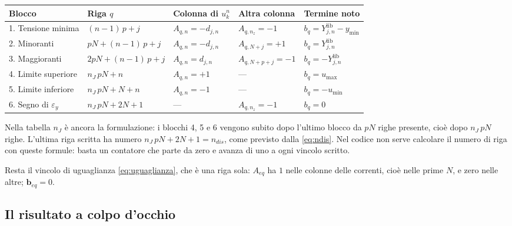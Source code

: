 \documentclass[11pt,a4paper]{article}
\newcommand{\vett}[1]{\boldsymbol{#1}}      %
\newcommand{\lib}{\mathrm{lib}}             %
\begin{document}
\begin{center}
\setlength{\tabcolsep}{4pt}
\begin{tabular}{lllll}
\toprule
Blocco & Riga $q$ & Colonna di $u^n_k$ & Altra colonna & Termine noto \\
\midrule
1. Tensione minima & $(n-1)\,p + j$ & $A_{q,n} = -d_{j,n}$ & $A_{q,n_z} = -1$ & $b_q = Y^\lib_{j,n} - y_{\min}$ \\
2. Minoranti & $pN + (n-1)\,p + j$ & $A_{q,n} = -d_{j,n}$ & $A_{q,N+j} = +1$ & $b_q = Y^\lib_{j,n}$ \\
3. Maggioranti & $2pN + (n-1)\,p + j$ & $A_{q,n} = d_{j,n}$ & $A_{q,N+p+j} = -1$ & $b_q = -Y^\lib_{j,n}$ \\
4. Limite superiore & $n_J\,pN + n$ & $A_{q,n} = +1$ & --- & $b_q = u_{\max}$ \\
5. Limite inferiore & $n_J\,pN + N + n$ & $A_{q,n} = -1$ & --- & $b_q = -u_{\min}$ \\
6. Segno di $\varepsilon_y$ & $n_J\,pN + 2N + 1$ & --- & $A_{q,n_z} = -1$ & $b_q = 0$ \\
\bottomrule
\end{tabular}
\end{center}

\noindent
Nella tabella $n_J$ è ancora la formulazione: i blocchi 4, 5 e 6 vengono subito
dopo l'ultimo blocco da $pN$ righe presente, cioè dopo $n_J\,pN$ righe. L'ultima
riga scritta ha numero $n_J\,pN + 2N + 1 = n_{dis}$, come previsto dalla
\eqref{eq:ndis}. Nel codice non serve calcolare il numero di riga con queste
formule: basta un contatore che parte da zero e avanza di uno a ogni vincolo
scritto.

Resta il vincolo di uguaglianza \eqref{eq:uguaglianza}, che è una riga sola:
$A_{eq}$ ha $1$ nelle colonne delle correnti, cioè nelle prime $N$, e zero
nelle altre; $\vett{b}_{eq} = 0$.

\subsection{Il risultato a colpo d'occhio}\label{sec:blocchi}
\end{document}
